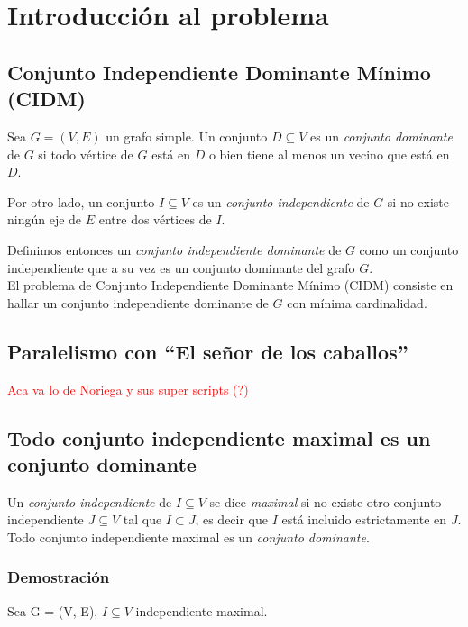 \section{Introducci\'on al problema}
\subsection{Conjunto Independiente Dominante M\'inimo (CIDM)}

Sea $G = (V, E)$ un grafo simple. Un conjunto $D \subseteq V$ es un \emph{conjunto dominante} de $G$ si todo v\'ertice de $G$ est\'a en $D$ o bien tiene al menos un vecino que est\'a en $D$. 

Por otro lado, un conjunto $I \subseteq V$ es un \emph{conjunto independiente} de $G$ si no existe ning\'un eje de $E$ entre dos v\'ertices de $I$. 

Definimos entonces un \emph{conjunto independiente dominante} de $G$ como un conjunto independiente que a su vez es un conjunto dominante del grafo $G$.\\

El problema de Conjunto Independiente Dominante M\'inimo (CIDM) consiste en hallar un conjunto independiente dominante de $G$ con m\'inima cardinalidad.

\subsection{Paralelismo con ``El se\~nor de los caballos''}

\textcolor{red}{Aca va lo de Noriega y sus super scripts (?)}

\subsection{Todo conjunto independiente maximal es un conjunto dominante}

 Un \emph{conjunto independiente} de $I \subseteq V$ se dice \emph{maximal} si no existe otro conjunto independiente $J \subseteq V$ tal que $I \subset J$, es decir que $I$ est\'a incluido estrictamente en $J$. Todo conjunto independiente maximal es un \emph{conjunto dominante}.
 
\subsubsection*{Demostraci\'on}

Sea G = (V, E), $I \subseteq V$ independiente maximal.

